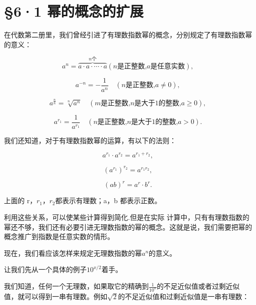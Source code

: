 \section{§6·1 幂的概念的扩展}

在代数第二册里，我们曾经引进了有理数指数幂的概念，分别规定了有理数指数幂的意义：

\[
a^{n} = \overbrace {a \cdot a \cdot \cdots \cdot a}^{n \text{个}} (n \text{是正整数,} a \text{是任意实数}),
\]

\[
a^{- n} = - \frac{1}{a^{n}} \quad (n \text{是正整数,} a \neq 0),
\]

\[
a^{\frac{n}{n}} = \sqrt[n]{a^{n}} \quad (m \text{是正整数,} n \text{是大于} 1 \text{的整数,} a \geqslant 0),
\]

\[
a^{r_{1}} = \frac{1}{a^{r_{1}}} \quad (n \text{是正整数,} n \text{是大于} 1 \text{的整数,} a > 0).
\]

我们还知道，对于有理数指数幂的运算，有以下的法则：

\[
a^{r_{1}} \cdot a^{r_{2}} = a^{r_{1} + r_{2}},
\]

\[
\left(a^{r_{1}}\right)^{r_{2}} = a^{r_{1} r_{2}},
\]

\[
(a b)^{r} = a^{r} \cdot b^{r}.
\]

上面的 r，\(r_{1}\)，\(r_{2}\)都表示有理数；a，b 都表示正数。

利用这些关系，可以使某些计算得到简化.但是在实际
计算中，只有有理数指数的幂还不够，我们还有必要引进无理数指数的幂的概念。这就是说，我们需要把幂的概念推广到指数是任意实数的情形。

现在，我们看应该怎样来规定无理数指数的幂\(a^n\)的意义。

让我们先从一个具体的例子\(10^{x/2}\)着手。

我们知道，任何一个无理数，如果取它的精确到\(\frac{1}{10^n}\)的不足近似值或者过剩近似值，就可以得到一串有理数。例如\(\sqrt{2}\)的不足近似值和过剩近似值是一串有理数：

